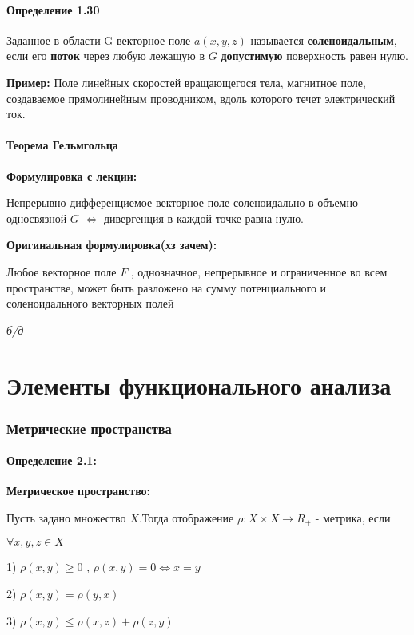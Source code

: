 \documentclass[12pt]{article}
\begin{document}
\subsection*{Определение 1.30}
Заданное в области G векторное поле $a(x, y, z)$ называется \textbf{соленоидальным}, если его \textbf{поток} через любую лежащую в $G$ \textbf{допустимую} поверхность равен нулю.	

\textbf{Пример:} Поле линейных скоростей вращающегося тела, магнитное поле, создаваемое прямолинейным проводником, вдоль которого течет электрический ток.

\subsection*{Теорема	 Гельмгольца}
	\par \textbf{Формулировка с лекции:}
	
		Непрерывно дифференциемое векторное поле соленоидально в объемно-односвязной $G$ $\Leftrightarrow$ дивергенция в каждой точке 		равна нулю.
	
	\par \textbf{Оригинальная формулировка(хз зачем):}
	
		Любое векторное поле $F$ , однозначное, непрерывное и ограниченное во всем пространстве, может быть разложено на сумму потенциального и соленоидального векторных полей	
	
	\textit{б/д}
	
\newpage	
\part{Элементы функционального анализа}
\section{Метрические пространства}
\subsection*{Определение 2.1:}
	\textbf{Метрическое пространство:}
	
	Пусть задано множество $X$.Тогда отображение $\rho: X \times X \to R_+$ - метрика, если 
	
	$\forall x,y,z \in X$
	
	1) $\rho(x,y) \ge 0$ , $\rho(x,y) = 0 \Leftrightarrow x = y$
	
	2) $\rho(x,y) = \rho(y,x)$
	
	3) $\rho(x,y) \leq \rho(x,z) + \rho(z,y) $
	
\end{document}
